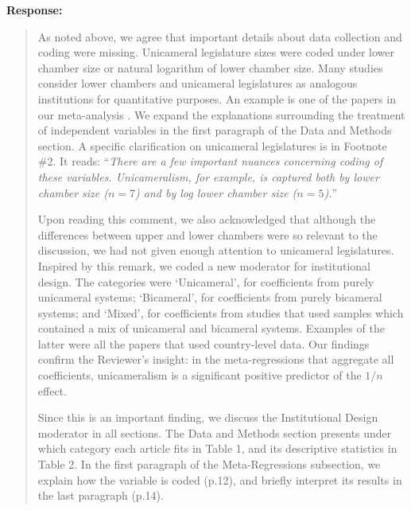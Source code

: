 \documentclass[a4paper,12pt]{article}
\begin{document}
\vspace{.3cm}

\noindent \textbf{Response:} 
\begin{quote}
    As noted above, we agree that important details about data collection and coding were missing. Unicameral legislature sizes were coded under lower chamber size or natural logarithm of lower chamber size. Many studies consider lower chambers and unicameral legislatures as analogous institutions for quantitative purposes. An example is one of the papers in our meta-analysis \citep{stein1998institutional}. We expand the explanations surrounding the treatment of independent variables in the first paragraph of the Data and Methods section. A specific clarification on unicameral legislatures is in Footnote \#2. It reads: ``\textit{There are a few important nuances concerning coding of these variables. Unicameralism, for example, is captured both by lower chamber size ($n = 7$) and by log lower chamber size ($n = 5$).}''
    
    Upon reading this comment, we also acknowledged that although the differences between upper and lower chambers were so relevant to the discussion, we had not given enough attention to unicameral legislatures. Inspired by this remark, we coded a new moderator for institutional design. The categories were `Unicameral', for coefficients from purely unicameral systems; `Bicameral', for coefficients from purely bicameral systems; and `Mixed', for coefficients from studies that used samples which contained a mix of unicameral and bicameral systems. Examples of the latter were all the papers that used country-level data. Our findings confirm the Reviewer's insight: in the meta-regressions that aggregate all coefficients, unicameralism is a significant positive predictor of the $1/n$ effect. 
    
    Since this is an important finding, we discuss the Institutional Design moderator in all sections. The Data and Methods section presents under which category each article fits in Table 1, and its descriptive statistics in Table 2. In the first paragraph of the Meta-Regressions subsection, we explain how the variable is coded (p.12), and briefly interpret its results in the last paragraph (p.14).
    

\end{quote}
\end{document}

